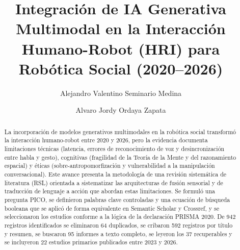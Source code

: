 \documentclass[runningheads]{llncs}
\begin{document}
\title{Integración de IA Generativa Multimodal en la Interacción Humano-Robot (HRI) para Robótica Social (2020--2026)}

\author{Alejandro Valentino Seminario Medina \and
Alvaro Jordy Ordaya Zapata}

\maketitle

\begin{abstract}
La incorporación de modelos generativos multimodales en la robótica social transformó la interacción humano-robot entre 2020 y 2026, pero la evidencia documenta limitaciones técnicas (latencia, errores de reconocimiento de voz y desincronización entre habla y gesto), cognitivas (fragilidad de la Teoría de la Mente y del razonamiento espacial) y éticas (sobre-antropomorfización y vulnerabilidad a la manipulación conversacional). Este avance presenta la metodología de una revisión sistemática de literatura (RSL) orientada a sistematizar las arquitecturas de fusión sensorial y de traducción de lenguaje a acción que abordan estas limitaciones. Se formuló una pregunta PICO, se definieron palabras clave controladas y una ecuación de búsqueda booleana que se aplicó de forma equivalente en Semantic Scholar y Crossref, y se seleccionaron los estudios conforme a la lógica de la declaración PRISMA 2020. De 942 registros identificados se eliminaron 64 duplicados, se cribaron 592 registros por título y resumen, se buscaron 95 informes a texto completo, se leyeron los 37 recuperables y se incluyeron 22 estudios primarios publicados entre 2023 y 2026.

\end{abstract}

\end{document}
